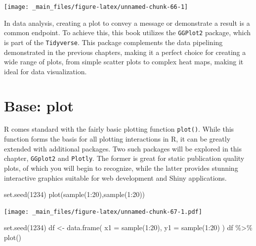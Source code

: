 \documentclass[
]{book}
\newenvironment{Shaded}{\begin{snugshade}}{\end{snugshade}}
\newcommand{\AttributeTok}[1]{\textcolor[rgb]{0.77,0.63,0.00}{#1}}
\newcommand{\DecValTok}[1]{\textcolor[rgb]{0.00,0.00,0.81}{#1}}
\newcommand{\FunctionTok}[1]{\textcolor[rgb]{0.00,0.00,0.00}{#1}}
\newcommand{\NormalTok}[1]{#1}
\newcommand{\OtherTok}[1]{\textcolor[rgb]{0.56,0.35,0.01}{#1}}
\newcommand{\SpecialCharTok}[1]{\textcolor[rgb]{0.00,0.00,0.00}{#1}}
\begin{document}
\begin{center}\texttt{[image: \_main\_files/figure-latex/unnamed-chunk-66-1]} \end{center}

In data analysis, creating a plot to convey a message or demonstrate a result is a common endpoint. To achieve this, this book utilizes the \texttt{GGPlot2} package, which is part of the \texttt{Tidyverse}. This package complements the data pipelining demonstrated in the previous chapters, making it a perfect choice for creating a wide range of plots, from simple scatter plots to complex heat maps, making it ideal for data visualization.

\hypertarget{base-plot}{%
\section{Base: plot}\label{base-plot}}

R comes standard with the fairly basic plotting function \texttt{plot()}. While this function forms the basis for all plotting interactions in R, it can be greatly extended with additional packages. Two such packages will be explored in this chapter, \texttt{GGplot2} and \texttt{Plotly}. The former is great for static publication quality plots, of which you will begin to recognize, while the latter provides stunning interactive graphics suitable for web development and Shiny applications.

\begin{Shaded}
\begin{Highlighting}[]
\FunctionTok{set.seed}\NormalTok{(}\DecValTok{1234}\NormalTok{)}
\FunctionTok{plot}\NormalTok{(}\FunctionTok{sample}\NormalTok{(}\DecValTok{1}\SpecialCharTok{:}\DecValTok{20}\NormalTok{),}\FunctionTok{sample}\NormalTok{(}\DecValTok{1}\SpecialCharTok{:}\DecValTok{20}\NormalTok{))}
\end{Highlighting}
\end{Shaded}

\texttt{[image: \_main\_files/figure-latex/unnamed-chunk-67-1.pdf]}

\begin{Shaded}
\begin{Highlighting}[]
\FunctionTok{set.seed}\NormalTok{(}\DecValTok{1234}\NormalTok{)}
\NormalTok{df }\OtherTok{\textless{}{-}} \FunctionTok{data.frame}\NormalTok{( }\AttributeTok{x1 =} \FunctionTok{sample}\NormalTok{(}\DecValTok{1}\SpecialCharTok{:}\DecValTok{20}\NormalTok{), }\AttributeTok{y1 =} \FunctionTok{sample}\NormalTok{(}\DecValTok{1}\SpecialCharTok{:}\DecValTok{20}\NormalTok{) )}
\NormalTok{df }\SpecialCharTok{\%\textgreater{}\%} \FunctionTok{plot}\NormalTok{()}
\end{Highlighting}
\end{Shaded}
\end{document}
